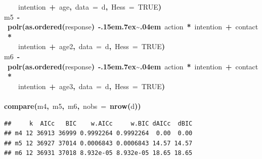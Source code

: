 \documentclass{article}
\makeatletter
\newcommand{\hlnumber}[1]{\textcolor[rgb]{0,0,0}{#1}}%
\newcommand{\hlfunctioncall}[1]{\textcolor[rgb]{.5,0,.33}{\textbf{#1}}}%
\newcommand{\hlkeyword}[1]{\textbf{#1}}%
\newcommand{\hlargument}[1]{\textcolor[rgb]{.69,.25,.02}{#1}}%
\newcommand{\hlassignement}[1]{\textbf{#1}}%
\newcommand{\hlsymbol}[1]{#1}%
\def\urltilda{\kern -.15em\lower .7ex\hbox{\~{}}\kern .04em}%
\newcommand{\hlstd}[1]{\textcolor[rgb]{0,0,0}{#1}}%
\newenvironment{kframe}{%
 \def\FrameCommand##1{\hskip\@totalleftmargin \hskip-\fboxsep
 \colorbox{shadecolor}{##1}\hskip-\fboxsep
     \hskip-\linewidth \hskip-\@totalleftmargin \hskip\columnwidth}%
 \MakeFramed {\advance\hsize-\width
   \@totalleftmargin\z@ \linewidth\hsize
   \@setminipage}}%
 {\par\unskip\endMakeFramed}
\newenvironment{knitrout}{}{} %
\makeatother
\begin{document}
\begin{knitrout}
{\begin{kframe}
\begin{flushleft}
\hlstd{}{\ }{\ }{\ }{\ }\hlsymbol{intention}{\ }\hlkeyword{+}{\ }\hlsymbol{age}\hlkeyword{,}{\ }\hlargument{data}{\ }\hlargument{=}{\ }\hlsymbol{d}\hlkeyword{,}{\ }\hlargument{Hess}{\ }\hlargument{=}{\ }\hlnumber{TRUE}\hlkeyword{)}\hspace*{\fill}\\
\hlstd{}\hlsymbol{m5}{\ }\hlassignement{\usebox{\hlnormalsizeboxlessthan}-}{\ }\hlfunctioncall{polr}\hlkeyword{(}\hlfunctioncall{as.ordered}\hlkeyword{(}\hlsymbol{response}\hlkeyword{)}{\ }\hlkeyword{\urltilda{}}{\ }\hlsymbol{action}{\ }\hlkeyword{*}{\ }\hlsymbol{intention}{\ }\hlkeyword{+}{\ }\hlsymbol{contact}{\ }\hlkeyword{*}\hspace*{\fill}\\
\hlstd{}{\ }{\ }{\ }{\ }\hlsymbol{intention}{\ }\hlkeyword{+}{\ }\hlsymbol{age2}\hlkeyword{,}{\ }\hlargument{data}{\ }\hlargument{=}{\ }\hlsymbol{d}\hlkeyword{,}{\ }\hlargument{Hess}{\ }\hlargument{=}{\ }\hlnumber{TRUE}\hlkeyword{)}\hspace*{\fill}\\
\hlstd{}\hlsymbol{m6}{\ }\hlassignement{\usebox{\hlnormalsizeboxlessthan}-}{\ }\hlfunctioncall{polr}\hlkeyword{(}\hlfunctioncall{as.ordered}\hlkeyword{(}\hlsymbol{response}\hlkeyword{)}{\ }\hlkeyword{\urltilda{}}{\ }\hlsymbol{action}{\ }\hlkeyword{*}{\ }\hlsymbol{intention}{\ }\hlkeyword{+}{\ }\hlsymbol{contact}{\ }\hlkeyword{*}\hspace*{\fill}\\
\hlstd{}{\ }{\ }{\ }{\ }\hlsymbol{intention}{\ }\hlkeyword{+}{\ }\hlsymbol{age3}\hlkeyword{,}{\ }\hlargument{data}{\ }\hlargument{=}{\ }\hlsymbol{d}\hlkeyword{,}{\ }\hlargument{Hess}{\ }\hlargument{=}{\ }\hlnumber{TRUE}\hlkeyword{)}\hspace*{\fill}\\
\hlstd{}\hspace*{\fill}\\
\hlstd{}\hlfunctioncall{compare}\hlkeyword{(}\hlsymbol{m4}\hlkeyword{,}{\ }\hlsymbol{m5}\hlkeyword{,}{\ }\hlsymbol{m6}\hlkeyword{,}{\ }\hlargument{nobs}{\ }\hlargument{=}{\ }\hlfunctioncall{nrow}\hlkeyword{(}\hlsymbol{d}\hlkeyword{)}\hlkeyword{)}\mbox{}
\normalfont
\end{flushleft}
\begin{verbatim}
##     k  AICc   BIC    w.AICc     w.BIC dAICc  dBIC
## m4 12 36913 36999 0.9992264 0.9992264  0.00  0.00
## m5 12 36927 37014 0.0006843 0.0006843 14.57 14.57
## m6 12 36931 37018 8.932e-05 8.932e-05 18.65 18.65
\end{verbatim}
\begin{flushleft}

\end{flushleft}
\end{kframe}}
\end{knitrout}
\end{document}
